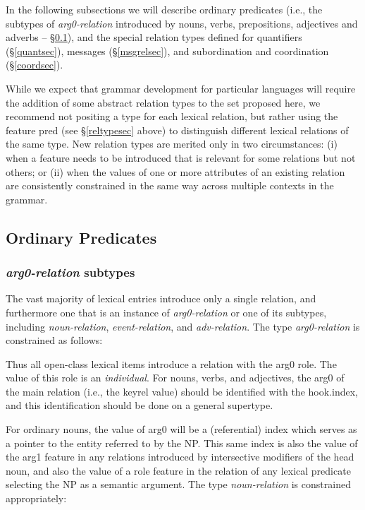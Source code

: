 \documentclass[12pt]{article}
\newcommand{\es}{\enumsentence}
\begin{document}
In the following subsections we will describe
ordinary predicates (i.e., the subtypes of {\it arg0-relation} introduced by
nouns, verbs, prepositions, adjectives and
adverbs -- \S\ref{ordpred}), and the special relation types defined
for quantifiers (\S\ref{quantsec}), messages (\S\ref{msgrelsec}), and
subordination and coordination (\S\ref{coordsec}).

While we expect that grammar development for particular languages will
require the addition of some abstract relation types to the set
proposed here, we recommend not positing a type for each lexical
relation, but rather using the feature {\sc pred} (see
\S\ref{reltypesec} above) to distinguish different lexical relations
of the same type.  New relation types are merited only in two circumstances:
(i) when a feature needs to be introduced that is relevant for some relations
but not others; or (ii) when the values of one or more attributes of an 
existing relation are consistently constrained in the same way across multiple
contexts in the grammar.

\subsection{Ordinary Predicates}
\label{ordpred}

\subsubsection{{\it arg0-relation} subtypes}
\label{arg0sec}

The vast majority of lexical entries introduce only a single relation,
and furthermore one that is an instance of {\it arg0-relation} or one of its
subtypes, including {\it noun-relation}, {\it event-relation}, and {\it adv-relation}.  
The type {\it arg0-relation} is constrained as follows:

\es{
\begin{avm}
{\it arg0-relation}: \[ arg0 & individual \]
\end{avm}
}

Thus all open-class lexical items introduce a relation with the {\sc
arg0} role.  The value of this role is an {\it individual}.  For nouns,
verbs, and adjectives, the {\sc arg0} of the main relation (i.e., the 
{\sc keyrel} value) should be identified with
the {\sc hook.index}, and this identification should be done on a general
supertype.

For ordinary nouns, the value of {\sc arg0} will be a (referential) index 
which serves as a pointer
to the entity referred to by the NP.  This
same index is also the value of the {\sc arg1} feature in any relations
introduced by intersective modifiers of the head noun, and also the value of 
a role feature in the relation of any lexical predicate selecting the NP as a 
semantic argument.  The type
{\it noun-relation} is constrained appropriately:
\end{document}
